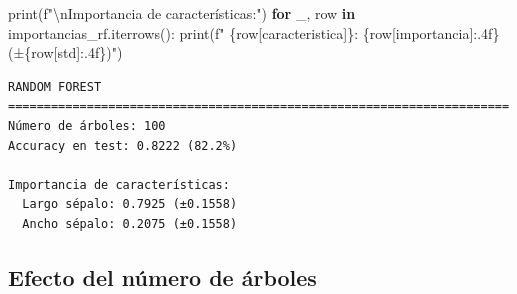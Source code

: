 \documentclass[
  doc,
  floatsintext,
  longtable,
  a4paper,
  nolmodern,
  notxfonts,
  notimes,
  12pt,
  colorlinks=true,linkcolor=blue,citecolor=blue,urlcolor=blue]{apa7}
\newenvironment{Shaded}{\begin{snugshade}}{\end{snugshade}}
\newcommand{\BuiltInTok}[1]{\textcolor[rgb]{0.00,0.23,0.31}{#1}}
\newcommand{\CharTok}[1]{\textcolor[rgb]{0.13,0.47,0.30}{#1}}
\newcommand{\ControlFlowTok}[1]{\textcolor[rgb]{0.00,0.23,0.31}{\textbf{#1}}}
\newcommand{\KeywordTok}[1]{\textcolor[rgb]{0.00,0.23,0.31}{\textbf{#1}}}
\newcommand{\NormalTok}[1]{\textcolor[rgb]{0.00,0.23,0.31}{#1}}
\newcommand{\SpecialCharTok}[1]{\textcolor[rgb]{0.37,0.37,0.37}{#1}}
\newcommand{\SpecialStringTok}[1]{\textcolor[rgb]{0.13,0.47,0.30}{#1}}
\newcommand{\StringTok}[1]{\textcolor[rgb]{0.13,0.47,0.30}{#1}}
\begin{document}
\begin{Shaded}
\begin{Highlighting}[]
\BuiltInTok{print}\NormalTok{(}\SpecialStringTok{f"}\CharTok{\textbackslash{}n}\SpecialStringTok{Importancia de características:"}\NormalTok{)}
\ControlFlowTok{for}\NormalTok{ \_, row }\KeywordTok{in}\NormalTok{ importancias\_rf.iterrows():}
    \BuiltInTok{print}\NormalTok{(}\SpecialStringTok{f"  }\SpecialCharTok{\{}\NormalTok{row[}\StringTok{\textquotesingle{}caracteristica\textquotesingle{}}\NormalTok{]}\SpecialCharTok{\}}\SpecialStringTok{: }\SpecialCharTok{\{}\NormalTok{row[}\StringTok{\textquotesingle{}importancia\textquotesingle{}}\NormalTok{]}\SpecialCharTok{:.4f\}}\SpecialStringTok{ (±}\SpecialCharTok{\{}\NormalTok{row[}\StringTok{\textquotesingle{}std\textquotesingle{}}\NormalTok{]}\SpecialCharTok{:.4f\}}\SpecialStringTok{)"}\NormalTok{)}
\end{Highlighting}
\end{Shaded}

\begin{verbatim}
RANDOM FOREST
======================================================================
Número de árboles: 100
Accuracy en test: 0.8222 (82.2%)

Importancia de características:
  Largo sépalo: 0.7925 (±0.1558)
  Ancho sépalo: 0.2075 (±0.1558)
\end{verbatim}

\subsection{Efecto del número de
árboles}\label{efecto-del-nuxfamero-de-uxe1rboles}
\end{document}
